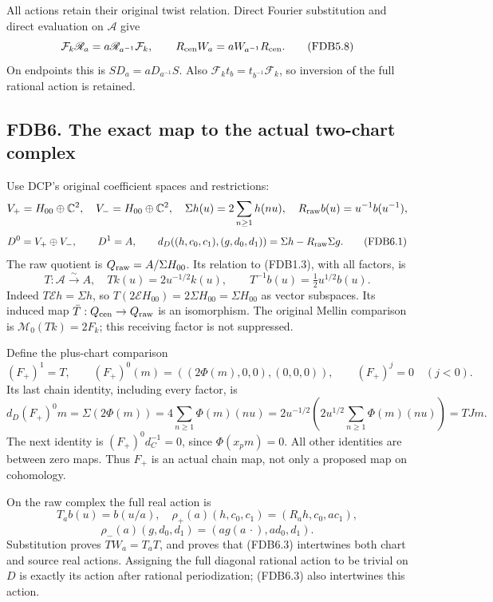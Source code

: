 All actions retain their original twist relation. Direct Fourier
substitution and direct evaluation on \(\mathcal A\) give \[
\mathcal F_k\mathscr R_a=a\mathscr R_{a^{-1}}\mathcal F_k,
\qquad R_{\rm cen}W_a=aW_{a^{-1}}R_{\rm cen}.
\tag{FDB5.8}
\] On endpoints this is \(S D_a=a D_{a^{-1}}S\). Also
\(\mathcal F_k t_b=t_{b^{-1}}\mathcal F_k\), so inversion of the full
rational action is retained.

\subsection{FDB6. The exact map to the actual two-chart
complex}\label{fdb6.-the-exact-map-to-the-actual-two-chart-complex}

Use DCP's original coefficient spaces and restrictions: \[
V_+=H_{00}\oplus\mathbb C^2,\quad
V_-=H_{00}\oplus\mathbb C^2,\quad
\Sigma h(u)=2\sum_{n\ge1}h(nu),\quad
R_{\rm raw}b(u)=u^{-1}b(u^{-1}),
\] \[
D^0=V_+\oplus V_-,\qquad D^1=A,\qquad
d_D((h,c_0,c_1),(g,d_0,d_1))=\Sigma h-R_{\rm raw}\Sigma g.
\tag{FDB6.1}
\] The raw quotient is \(Q_{\rm raw}=A/\Sigma H_{00}\). Its relation to
(FDB1.3), with all factors, is \[
T:\mathcal A\xrightarrow{\sim}A,\quad Tk(u)=2u^{-1/2}k(u),
\qquad T^{-1}b(u)=\tfrac12u^{1/2}b(u).
\tag{FDB6.2}
\] Indeed \(T\mathcal Eh=\Sigma h\), so
\(T(2\mathcal EH_{00})=2\Sigma H_{00}=\Sigma H_{00}\) as vector
subspaces. Its induced map \(\bar T:Q_{\rm cen}\to Q_{\rm raw}\) is an
isomorphism. The original Mellin comparison is
\(\mathcal M_0(Tk)=2F_k\); this receiving factor is not suppressed.

Define the plus-chart comparison \[
(F_+)^1=T,\qquad
(F_+)^0(m)=((2\Phi(m),0,0),(0,0,0)),\qquad
(F_+)^j=0\quad(j<0).
\tag{FDB6.3}
\] Its last chain identity, including every factor, is \[
d_D(F_+)^0m=\Sigma(2\Phi(m))
=4\sum_{n\ge1}\Phi(m)(nu)
=2u^{-1/2}(2u^{1/2}\sum_{n\ge1}\Phi(m)(nu))
=T Jm.
\tag{FDB6.4}
\] The next identity is \((F_+)^0d_C^{-1}=0\), since \(\Phi(x_pm)=0\).
All other identities are between zero maps. Thus \(F_+\) is an actual
chain map, not only a proposed map on cohomology.

On the raw complex the full real action is \[
T_a b(u)=b(u/a),
\quad\rho_+(a)(h,c_0,c_1)=(R_a h,c_0,ac_1),
\] \[
\rho_-(a)(g,d_0,d_1)=(a g(a\,\cdot),ad_0,d_1).
\tag{FDB6.5}
\] Substitution proves \(TW_a=T_aT\), and proves that (FDB6.3)
intertwines both chart and source real actions. Assigning the full
diagonal rational action to be trivial on \(D\) is exactly its action
after rational periodization; (FDB6.3) also intertwines this action.


